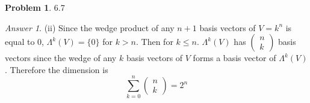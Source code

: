 \documentclass[10pt,a4paper]{article}
\theoremstyle{plain}
\theoremstyle{definition}
\newtheorem*{problem*}{Problem}
\theoremstyle{remark}
\newtheorem*{answer*}{Answer}
\newcommand{\<}{\langle}
\renewcommand{\>}{\rangle}
\begin{document}
\begin{problem*} 6.7
\end{problem*}

\begin{answer*} \hfill

(ii) Since the wedge product of any $n+1$ basis vectors of $V=k^n$ is equal to 0, $\Lambda^k(V) = \{0\}$ for $k>n$. Then for $k\leq n$. $\Lambda^k(V)$ has $\begin{pmatrix}n \\ k \end{pmatrix}$ basis vectors since the wedge of any $k$ basis vectors of $V$ forms a basis vector of $\Lambda^k(V)$. Therefore the dimension is $$\sum_{k=0}^n \begin{pmatrix} n \\ k \end{pmatrix} = 2^n$$

\end{answer*}
\end{document}
